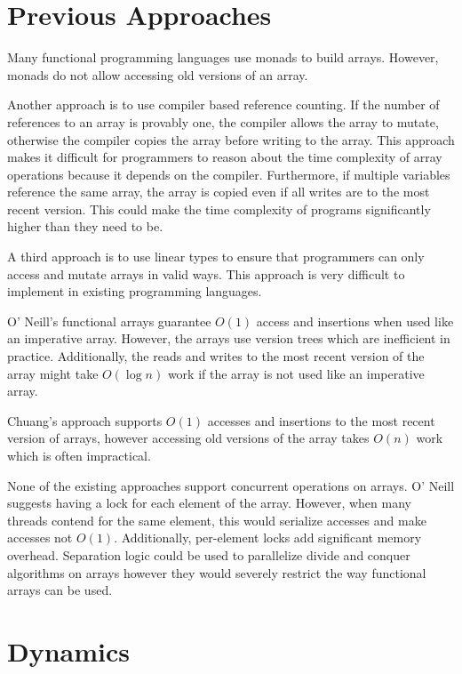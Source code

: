 \documentclass[preprint]{sigplanconf}
\begin{document}
\section{Previous Approaches}

Many functional programming languages use monads to build arrays. However, monads do not allow accessing old versions of an array.

Another approach is to use compiler based reference counting. If the number of references to an array is provably one, the compiler allows the array to mutate, otherwise the compiler copies the array before writing to the array. This approach makes it difficult for programmers to reason about the time complexity of array operations because it depends on the compiler. Furthermore, if multiple variables reference the same array, the array is copied even if all writes are to the most recent version. This could make the time complexity of programs significantly higher than they need to be.

A third approach is to use linear types to ensure that programmers can only access and mutate arrays in valid ways. This approach is very difficult to implement in existing programming languages.

O' Neill's functional arrays guarantee $O(1)$ access and insertions when used like an imperative array. However, the arrays use version trees which are inefficient in practice. Additionally, the reads and writes to the most recent version of the array might take $O(\log{n})$ work if the array is not used like an imperative array.

Chuang's approach supports $O(1)$ accesses and insertions to the most recent version of arrays, however accessing old versions of the array takes $O(n)$ work which is often impractical.

None of the existing approaches support concurrent operations on arrays. O' Neill suggests having a lock for each element of the array. However, when many threads contend for the same element, this would serialize accesses and make accesses not $O(1)$. Additionally, per-element locks add significant memory overhead. Separation logic could be used to parallelize divide and conquer algorithms on arrays however they would severely restrict the way functional arrays can be used.

\section{Dynamics}
\end{document}
